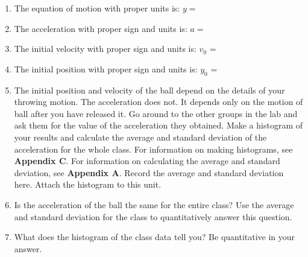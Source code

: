 \begin{enumerate}
\item The equation of motion with proper units is: $y =$\vspace{5mm}

\item The acceleration with proper sign and units is: $a =$ \vspace{5mm}

\item The initial velocity with proper sign and units is: \(v_{0} \) = \vspace{5mm}

\item The initial position with proper sign and units is: \(y_{0} \) = \vspace{5mm}

\item The initial position and velocity of the ball depend on the details of your throwing motion. 
The acceleration does not.
It depends only on the motion of ball after you have released it.
Go around to the other groups in the lab and ask them for the value of the acceleration they obtained.
Make a histogram of your results and calculate the average and standard deviation of the acceleration for the whole class.
For information on making histograms, see \textbf{Appendix C}. For information on calculating the average and
standard deviation, see \textbf{Appendix A}. Record the average and standard deviation here.
Attach the histogram to this unit.
\vspace{20mm}

\item Is the acceleration of the ball the same for the entire class? Use the average and standard deviation for the class to quantitatively answer this question.
\vspace{20mm}

\item What does the histogram of the class data tell you? Be quantitative in your answer.
\vspace{20mm}

\end{enumerate}
